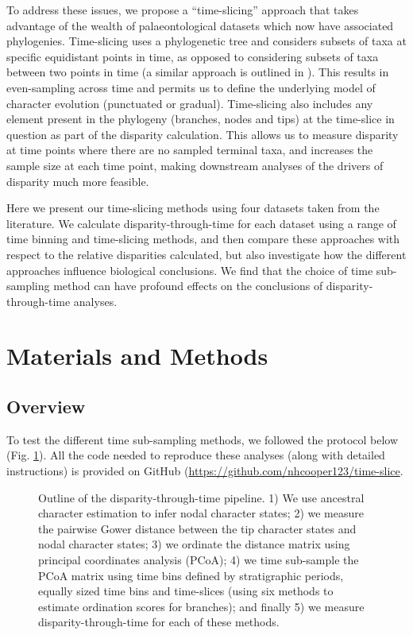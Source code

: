 \documentclass[12pt,a4paper]{article}
\begin{document}
To address these issues, we propose a ``time-slicing'' approach that takes advantage of the wealth of palaeontological datasets which now have associated phylogenies. 
Time-slicing uses a phylogenetic tree and considers subsets of taxa at specific equidistant points in time, as opposed to considering subsets of taxa between two points in time (a similar approach is outlined in \citep{halliday2016eutherian}).
This results in even-sampling across time and permits us to define the underlying model of character evolution (punctuated or gradual).  
Time-slicing also includes any element present in the phylogeny (branches, nodes and tips) at the time-slice in question as part of the disparity calculation.
This allows us to measure disparity at time points where there are no sampled terminal taxa, and increases the sample size at each time point, making downstream analyses of the drivers of disparity much more feasible.

Here we present our time-slicing methods using four datasets taken from the literature.
We calculate disparity-through-time for each dataset using a range of time binning and time-slicing methods, and then compare these approaches with respect to the relative disparities calculated, but also investigate how the different approaches influence biological conclusions. 
We find that the choice of time sub-sampling method can have profound effects on the conclusions of disparity-through-time analyses. 

\section{Materials and Methods}
\subsection{Overview}
\label{overview-section}
To test the different time sub-sampling methods, we followed the protocol below (Fig. \ref{fig:overview}). 
All the code needed to reproduce these analyses (along with detailed instructions) is provided on GitHub (\url{https://github.com/nhcooper123/time-slice}.

\begin{figure}[!htbp]
    \centering
    \caption[Outline of the disparity-through-time pipeline]
    {Outline of the disparity-through-time pipeline. 1) We use ancestral character estimation to infer nodal character states; 2) we measure the pairwise Gower distance between the tip character states and nodal character states; 3) we ordinate the distance matrix using principal coordinates analysis (PCoA); 4) we time sub-sample the PCoA matrix using time bins defined by stratigraphic periods, equally sized time bins and time-slices (using six methods to estimate ordination scores for branches); and finally 5) we measure disparity-through-time for each of these methods.}
    \label{fig:overview}
\end{figure}
\end{document}
